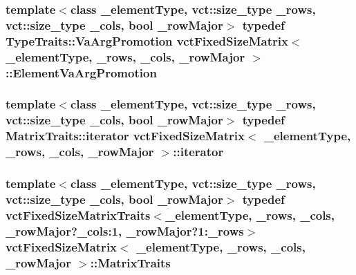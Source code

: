 \hypertarget{classvct_fixed_size_matrix_a68a3a606814298fd97f392dce89f9c7d}{
\subsubsection[{Element\-Va\-Arg\-Promotion}]{\setlength{\rightskip}{0pt plus 5cm}template$<$class \-\_\-element\-Type, vct\-::size\-\_\-type \-\_\-rows, vct\-::size\-\_\-type \-\_\-cols, bool \-\_\-row\-Major$>$ typedef Type\-Traits\-::\-Va\-Arg\-Promotion {\bf vct\-Fixed\-Size\-Matrix}$<$ \-\_\-element\-Type, \-\_\-rows, \-\_\-cols, \-\_\-row\-Major $>$\-::{\bf Element\-Va\-Arg\-Promotion}}}\label{classvct_fixed_size_matrix_a68a3a606814298fd97f392dce89f9c7d}
\hypertarget{classvct_fixed_size_matrix_a3512c7acacb6065a802898949cb78f43}{
\subsubsection[{iterator}]{\setlength{\rightskip}{0pt plus 5cm}template$<$class \-\_\-element\-Type, vct\-::size\-\_\-type \-\_\-rows, vct\-::size\-\_\-type \-\_\-cols, bool \-\_\-row\-Major$>$ typedef {\bf Matrix\-Traits\-::iterator} {\bf vct\-Fixed\-Size\-Matrix}$<$ \-\_\-element\-Type, \-\_\-rows, \-\_\-cols, \-\_\-row\-Major $>$\-::{\bf iterator}}}\label{classvct_fixed_size_matrix_a3512c7acacb6065a802898949cb78f43}
\hypertarget{classvct_fixed_size_matrix_a29b71912a8827d4baca637aebfe41eca}{
\subsubsection[{Matrix\-Traits}]{\setlength{\rightskip}{0pt plus 5cm}template$<$class \-\_\-element\-Type, vct\-::size\-\_\-type \-\_\-rows, vct\-::size\-\_\-type \-\_\-cols, bool \-\_\-row\-Major$>$ typedef {\bf vct\-Fixed\-Size\-Matrix\-Traits}$<$\-\_\-element\-Type, \-\_\-rows, \-\_\-cols, \-\_\-row\-Major?\-\_\-cols\-:1, \-\_\-row\-Major?1\-:\-\_\-rows$>$ {\bf vct\-Fixed\-Size\-Matrix}$<$ \-\_\-element\-Type, \-\_\-rows, \-\_\-cols, \-\_\-row\-Major $>$\-::{\bf Matrix\-Traits}}}\label{classvct_fixed_size_matrix_a29b71912a8827d4baca637aebfe41eca}
